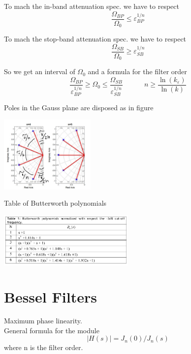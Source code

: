 To mach the in-band attenuation spec. we have to respect
\begin{equation}
\frac{\Omega_{BP}}{\Omega_0}\le \varepsilon_{BP}^{1/n}
\end{equation}

To mach the stop-band attenuation spec. we have to respect
\begin{equation}
\frac{\Omega_{SB}}{\Omega_0}\ge \varepsilon_{SB}^{1/n}
\end{equation}

So we get an interval of $\Omega_0$ and a formula for the filter order
\begin{equation}
\frac{\Omega_{BP}}{\varepsilon_{BP}^{1/n}} \ge \Omega_0 \le \frac{\Omega_{SB}}{\varepsilon_{SB}^{1/n}} \ \ \ \ \ \ \ \ \ \ \ \ \ \ n\ge \frac{\ln(k_{\varepsilon})}{\ln(k)}
\end{equation}

Poles in the Gauss plane are disposed as in figure


\centering
\includegraphics[width=0.35\textwidth]{Gaussbutt.png}\\
\raggedright

Table of Butterworth polynomials

\centering
\includegraphics[width=0.5\textwidth]{butt.png}\\
\raggedright


\section{Bessel Filters}

Maximum phase linearity.\\
General formula for the module 
\begin{equation}
|H(s)|=J_n(0)/J_n(s)
\end{equation}
where n is the filter order.

